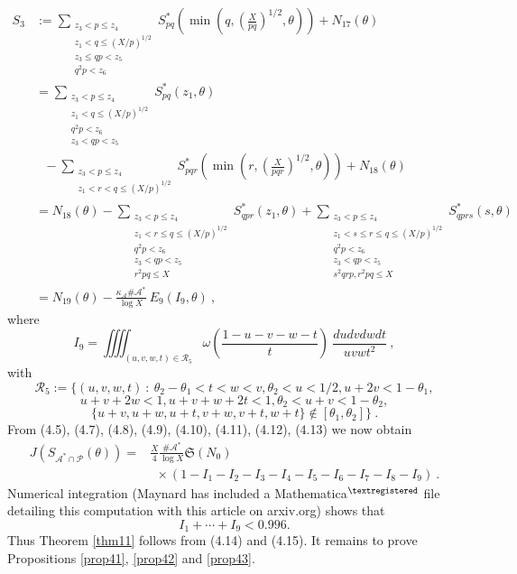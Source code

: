 \documentclass{amsart}
\numberwithin{equation}{subsection}
\begin{document}
\begin{align*}
S_3&:=\sum_{\substack{z_3<p\leq z_4 \\ z_1<q\leq (X/p)^{1/2} \\ z_3\leq qp< z_5 \\ q^2p<z_6}} S_{pq}^*\left(\min\left(q, \left(\frac{X}{pq}\right)^{1/2}, \theta\right)\right)+N_{17}(\theta)\\
&=\sum_{\substack{z_3<p\leq z_4 \\ z_1<q\leq (X/p)^{1/2} \\ q^2p<z_6 \\ z_3<qp<z_5}} S_{pq}^*(z_1, \theta)\\
&\ \ \ -\sum_{\substack{z_3<p\leq z_4 \\ z_1<r<q\leq (X/p)^{1/2}}}S_{pqr}^*\left(\min\left(r, \left(\frac{X}{pqr}\right)^{1/2}, \theta\right)\right)+N_{18}(\theta)\\
&=N_{18}(\theta)-\sum_{\substack{z_3<p\leq z_4 \\ z_1<r\leq q\leq (X/p)^{1/2}\\  q^2p<z_6 \\ z_3<qp<z_5 \\ r^2pq\leq X}} S_{qpr}^*(z_1, \theta)+ 
\sum_{\substack{z_3<p\leq z_4 \\ z_1<s\leq r\leq q\leq (X/p)^{1/2}\\  q^2p<z_6 \\ z_3<qp<z_5 \\ s^2qrp, r^2pq\leq X}} S_{qprs}^*(s, \theta)\\
&=N_{19}(\theta)-\frac{\kappa_{\mathcal{A}}\#\mathcal{A}^*}{\log X}\: E_9(I_9, \theta)\:,
\end{align*}
where 
\[
I_9=\iiiint_{(u,v,w,t)\in\mathcal{R}_5} \omega\left(\frac{1-u-v-w-t}{t}\right)\:\frac{dudvdwdt}{uvwt^2}\:,  \tag{4.13}
\]
with
$$\mathcal{R}_5:=\{(u,v,w,t)\::\:\theta_2-\theta_1<t<w<v, \theta_2<u<1/2, u+2v<1-\theta_1,$$
$$u+v+2w<1, u+v+w+2t<1, \theta_2<u+v<1-\theta_2,$$
$$\{ u+v, u+w, u+t, v+w, v+t, w+t \}\not\in [\theta_1, \theta_2]\}\:.$$
%
From (4.5), (4.7), (4.8), (4.9), (4.10), (4.11), (4.12), (4.13) we now obtain
\begin{align*}
J(S_{\mathcal{A}^*\cap \mathcal{P}}(\theta))=&  \frac{X}{4}\frac{\#\mathcal{A}^*}{\log X} \mathfrak{S}(N_0)\\
&\ \ \times (1-I_1-I_2-I_3-I_4-I_5-I_6-I_7-I_8-I_9)\:.   \tag{4.14}
\end{align*}
%
Numerical integration (Maynard \cite{maynard} has included a Mathematica${}^{\textregistered}$ file detailing this computation with this article on arxiv.org) shows that 
\[
I_1+\cdots+I_9<0.996. \tag{4.15}
\]
Thus Theorem \ref{thm11} follows from (4.14) and (4.15). It remains to prove Propositions \ref{prop41}, \ref{prop42} and \ref{prop43}.
\end{document}
